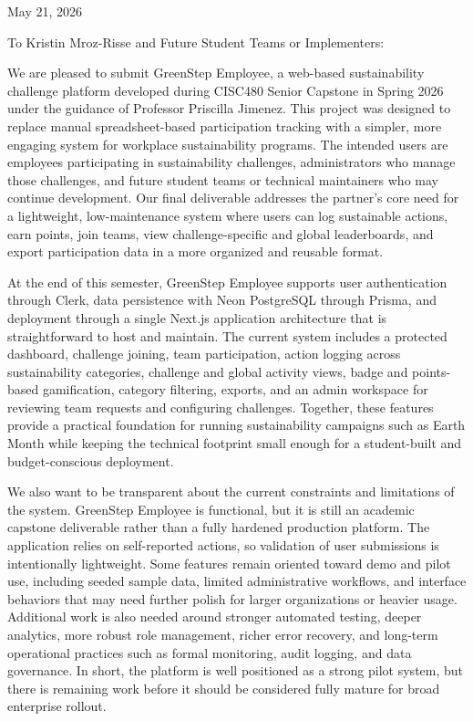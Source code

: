 \documentclass[12pt]{article}
\begin{document}
\begin{flushright}
May 21, 2026
\end{flushright}

\noindent
To Kristin Mroz-Risse and Future Student Teams or Implementers:

\medskip

\noindent
We are pleased to submit GreenStep Employee, a web-based sustainability challenge platform developed during CISC480 Senior Capstone in Spring 2026 under the guidance of Professor Priscilla Jimenez. This project was designed to replace manual spreadsheet-based participation tracking with a simpler, more engaging system for workplace sustainability programs. The intended users are employees participating in sustainability challenges, administrators who manage those challenges, and future student teams or technical maintainers who may continue development. Our final deliverable addresses the partner's core need for a lightweight, low-maintenance system where users can log sustainable actions, earn points, join teams, view challenge-specific and global leaderboards, and export participation data in a more organized and reusable format.

\medskip

\noindent
At the end of this semester, GreenStep Employee supports user authentication through Clerk, data persistence with Neon PostgreSQL through Prisma, and deployment through a single Next.js application architecture that is straightforward to host and maintain. The current system includes a protected dashboard, challenge joining, team participation, action logging across sustainability categories, challenge and global activity views, badge and points-based gamification, category filtering, exports, and an admin workspace for reviewing team requests and configuring challenges. Together, these features provide a practical foundation for running sustainability campaigns such as Earth Month while keeping the technical footprint small enough for a student-built and budget-conscious deployment.

\medskip

\noindent
We also want to be transparent about the current constraints and limitations of the system. GreenStep Employee is functional, but it is still an academic capstone deliverable rather than a fully hardened production platform. The application relies on self-reported actions, so validation of user submissions is intentionally lightweight. Some features remain oriented toward demo and pilot use, including seeded sample data, limited administrative workflows, and interface behaviors that may need further polish for larger organizations or heavier usage. Additional work is also needed around stronger automated testing, deeper analytics, more robust role management, richer error recovery, and long-term operational practices such as formal monitoring, audit logging, and data governance. In short, the platform is well positioned as a strong pilot system, but there is remaining work before it should be considered fully mature for broad enterprise rollout.
\end{document}
